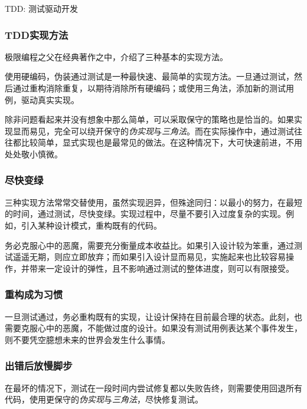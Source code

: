 \begin{content}
\begin{episode}{TDD: 测试驱动开发}
\begin{content}
\subsubsection{TDD实现方法}

极限编程之父在经典著作之中，介绍了三种基本的实现方法。

\begin{enum}
\end{enum}

使用硬编码，伪装通过测试是一种最快速、最简单的实现方法。一旦通过测试，然后通过重构消除重复，以期待消除所有硬编码；或使用三角法，添加新的测试用例，驱动真实实现。

除非问题看起来并没有想象中那么简单，可以采取保守的策略也是恰当的。如果实现显而易见，完全可以绕开保守的\emph{伪实现}与\emph{三角法}。而在实际操作中，通过测试往往都比较简单，显式实现也是最常见的做法。在这种情况下，大可快速前进，不用处处敬小慎微。

\subsubsection{尽快变绿}

三种实现方法常常交替使用，虽然实现迥异，但殊途同归：以最小的努力，在最短的时间，通过测试，尽快变绿。实现过程中，尽量不要引入过度复杂的实现。例如，引入某种设计模式，重构既有的代码。

务必克服心中的恶魔，需要充分衡量成本收益比。如果引入设计较为笨重，通过测试遥遥无期，则应立即放弃；而如果引入设计显而易见，实施起来也比较容易操作，并带来一定设计的弹性，且不影响通过测试的整体进度，则可以有限接受。

\subsubsection{重构成为习惯}

一旦测试通过，务必重构既有的实现，让设计保持在目前最合理的状态。此刻，也需要克服心中的恶魔，不能做过度的设计。如果没有测试用例表达某个事件发生，则不要凭空臆想未来的世界会发生什么事情。

\subsubsection{出错后放慢脚步}

在最坏的情况下，测试在一段时间内尝试修复都以失败告终，则需要使用回退所有代码，使用更保守的\emph{伪实现}与\emph{三角法}，尽快修复测试。


\end{content}
\end{episode}
\end{content}
